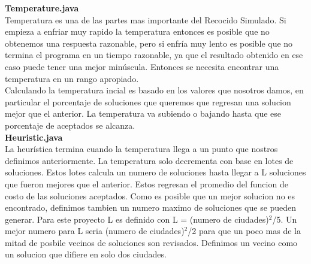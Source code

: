 \documentclass{article}
\begin{document}
    
    \textbf{Temperature.java} \\
    Temperatura es una de las partes mas importante del Recocido Simulado. Si empieza a enfriar muy rapido
    la temperatura entonces es posible que no obtenemos una respuesta razonable, pero si enfría muy lento
    es posible que no termina el programa en un tiempo razonable, ya que el resultado obtenido en ese caso
    puede tener una mejor minúscula. Entonces se necesita encontrar una temperatura en un rango apropiado.\\
    
    Calculando la temperatura incial es basado en los valores que nosotros damos, en particular el
    porcentaje de soluciones que queremos que regresan una solucion mejor que el anterior. La temperatura
    va subiendo o bajando hasta que ese porcentaje de aceptados se alcanza.\\
    
    
    
    \textbf{Heuristic.java} \\
     La heurística termina cuando la temperatura llega a un punto que nostros definimos anteriormente. La
    temperatura solo decrementa con base en lotes de soluciones. Estos lotes calcula un numero de soluciones
    hasta llegar a L soluciones que fueron mejores que el anterior. Estos regresan el promedio del funcion
    de costo de las soluciones aceptados. Como es posible que un mejor solucion no es encontrado, definimos
    tambien un numero maximo de soluciones que se pueden generar. Para este proyecto L es definido con
    L = (numero de ciudades)$^{2}$/5. Un mejor numero para L seria (numero de ciudades)$^{2}$/2 para que
    un poco mas de la mitad de posbile vecinos de soluciones son revisados. Definimos un vecino como un
    solucion que difiere en solo dos ciudades.\\
    
\end{document}
